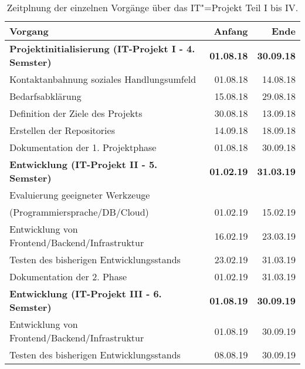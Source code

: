 \begin{table}[htp]
  \caption{Zeitplnung der einzelnen Vorgänge über das IT"=Projekt Teil I bis IV.}
  \bgroup
  \def\arraystretch{1.5}%
  \begin{tabular}{|l|r|r|}
    \hline
    \textbf{Vorgang}                                              & \textbf{Anfang}   & \textbf{Ende} \\ \hline
    \textbf{Projektinitialisierung (IT-Projekt I - 4. Semster)}   & \textbf{01.08.18} & \textbf{30.09.18} \\ \hline
    Kontaktanbahnung soziales Handlungsumfeld                     & 01.08.18          & 14.08.18 \\ \hline
    Bedarfsabklärung                                              & 15.08.18          & 29.08.18 \\ \hline
    Definition der Ziele des Projekts                             & 30.08.18          & 13.09.18 \\ \hline
    Erstellen der Repositories                                    & 14.09.18          & 18.09.18 \\ \hline
    Dokumentation der 1. Projektphase                             & 01.08.18          & 30.09.18 \\ \hline
    \textbf{Entwicklung (IT-Projekt II - 5. Semster)}             & \textbf{01.02.19} & \textbf{31.03.19} \\ \hline
    Evaluierung geeigneter Werkzeuge                              & & \\ 
    (Programmiersprache/DB/Cloud)                                 & 01.02.19          & 15.02.19 \\ \hline
    Entwicklung von Frontend/Backend/Infrastruktur                & 16.02.19          & 23.03.19 \\ \hline
    Testen des bisherigen Entwicklungsstands                      & 23.02.19          & 31.03.19 \\ \hline
    Dokumentation der 2. Phase                                    & 01.02.19          & 31.03.19 \\ \hline
    \textbf{Entwicklung (IT-Projekt III - 6. Semster)}            & \textbf{01.08.19} & \textbf{30.09.19} \\ \hline
    Entwicklung von Frontend/Backend/Infrastruktur                & 01.08.19          & 30.09.19 \\ \hline
    Testen des bisherigen Entwicklungsstands                      & 08.08.19          & 30.09.19 \\ \hline

\end{tabular}
\end{table}
